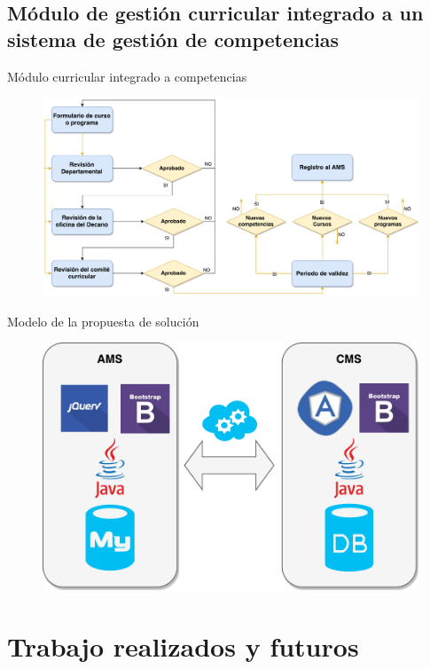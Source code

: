 \documentclass[10pt,xcolor=table ]{beamer}
\begin{document}
\subsection{Módulo de gestión curricular integrado a un sistema de gestión de competencias}
\begin{frame}{Módulo curricular integrado a competencias}
	\begin{figure}
		\centering
	    \includegraphics[scale=0.25,left]{../Figuras/propuesta/proposal}
	\end{figure}
\end{frame}

\begin{frame}{Modelo de la propuesta de solución}
	\begin{figure}
		\centering
	    \includegraphics[scale=0.55]{../Figuras/propuesta/architecture}
	\end{figure}
\end{frame}

\section{Trabajo realizados y futuros}
\end{document}
